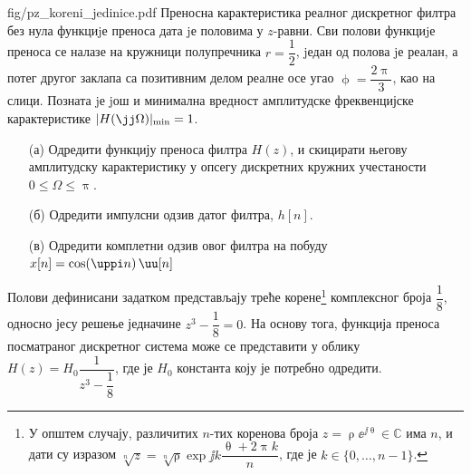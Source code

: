 \begin{slikaDesno}{fig/pz_koreni_jedinice.pdf}
    \PID 
    Преносна карактеристика реалног дискретног филтра без нула функциjе преноса
    дата jе половима у $z$-равни. Сви полови функциjе преноса се налазе на кружници
    полупречника $r = \dfrac12$, jедан од полова jе реалан, а потег другог заклапа са позитивним
    делом реалне осе угао $\upphi = \dfrac{2\uppi}{3}$, као на слици. Позната jе jош и минимална вредност
    амплитудске фреквенцијске карактеристике $|H(\jj\Omega)|_{\rm min} = 1$. 
    \begin{enumerate}
        \item[(а)]  Одредити функцију
                    преноса филтра $H(z)$, и скицирати његову амплитудску карактеристику у 
                    опсегу дискретних кружних учестаности $0 \leq \Omega \leq \uppi$.
    \end{enumerate}
\end{slikaDesno}
\begin{enumerate}
    \item[(б)] Одредити импулсни одзив датог филтра, $h[n]$. 
    \item[(в)] Одредити комплетни одзив овог филтра на побуду $x[n] = \cos(\uppi n)\, \uu[n]$
\end{enumerate}

\RESENJE
Полови дефинисани задатком представљају треће корене\footnote{У општем случају, различитих $n$-тих коренова  
броја $z = \uprho \ee^{\jj\uptheta} \in \mathbb C$ има $n$, и дати су изразом 
$\sqrt[n]{z} = \sqrt[n]{\uprho} \exp{\jj k \dfrac{\uptheta + 2\uppi k}{n}}$, где је $k \in \{0,\ldots,n-1\}$.} 
комплексног броја $\dfrac{1}{8}$, односно јесу решење једначине 
$z^3 - \dfrac{1}{8} = 0$. На основу тога, функција преноса посматраног дискретног система може се представити у облику 
$H(z) = H_0 \dfrac{1}{z^3 - \dfrac{1}{8}}$, где је $H_0$ константа коју је потребно одредити.  

